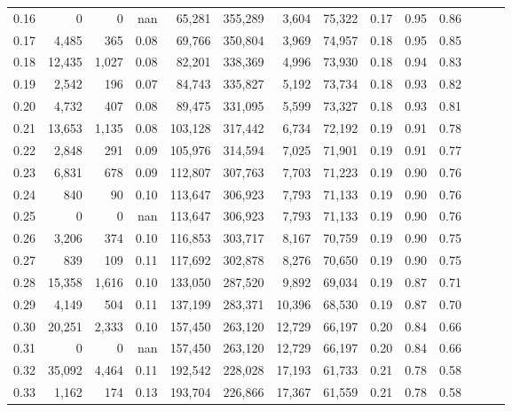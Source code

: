 \begin{tabular}{rrrrrrrrrrrrrr}
0.16 &       0 &      0 &   nan &   65,281 &  355,289 &   3,604 &  75,322 &  0.17 &  0.95 &      0.86 \\
0.17 &   4,485 &    365 &  0.08 &   69,766 &  350,804 &   3,969 &  74,957 &  0.18 &  0.95 &      0.85 \\
0.18 &  12,435 &  1,027 &  0.08 &   82,201 &  338,369 &   4,996 &  73,930 &  0.18 &  0.94 &      0.83 \\
0.19 &   2,542 &    196 &  0.07 &   84,743 &  335,827 &   5,192 &  73,734 &  0.18 &  0.93 &      0.82 \\
0.20 &   4,732 &    407 &  0.08 &   89,475 &  331,095 &   5,599 &  73,327 &  0.18 &  0.93 &      0.81 \\
0.21 &  13,653 &  1,135 &  0.08 &  103,128 &  317,442 &   6,734 &  72,192 &  0.19 &  0.91 &      0.78 \\
0.22 &   2,848 &    291 &  0.09 &  105,976 &  314,594 &   7,025 &  71,901 &  0.19 &  0.91 &      0.77 \\
0.23 &   6,831 &    678 &  0.09 &  112,807 &  307,763 &   7,703 &  71,223 &  0.19 &  0.90 &      0.76 \\
0.24 &     840 &     90 &  0.10 &  113,647 &  306,923 &   7,793 &  71,133 &  0.19 &  0.90 &      0.76 \\
0.25 &       0 &      0 &   nan &  113,647 &  306,923 &   7,793 &  71,133 &  0.19 &  0.90 &      0.76 \\
0.26 &   3,206 &    374 &  0.10 &  116,853 &  303,717 &   8,167 &  70,759 &  0.19 &  0.90 &      0.75 \\
0.27 &     839 &    109 &  0.11 &  117,692 &  302,878 &   8,276 &  70,650 &  0.19 &  0.90 &      0.75 \\
0.28 &  15,358 &  1,616 &  0.10 &  133,050 &  287,520 &   9,892 &  69,034 &  0.19 &  0.87 &      0.71 \\
0.29 &   4,149 &    504 &  0.11 &  137,199 &  283,371 &  10,396 &  68,530 &  0.19 &  0.87 &      0.70 \\
0.30 &  20,251 &  2,333 &  0.10 &  157,450 &  263,120 &  12,729 &  66,197 &  0.20 &  0.84 &      0.66 \\
0.31 &       0 &      0 &   nan &  157,450 &  263,120 &  12,729 &  66,197 &  0.20 &  0.84 &      0.66 \\
0.32 &  35,092 &  4,464 &  0.11 &  192,542 &  228,028 &  17,193 &  61,733 &  0.21 &  0.78 &      0.58 \\
0.33 &   1,162 &    174 &  0.13 &  193,704 &  226,866 &  17,367 &  61,559 &  0.21 &  0.78 &      0.58 \\

\end{tabular}
